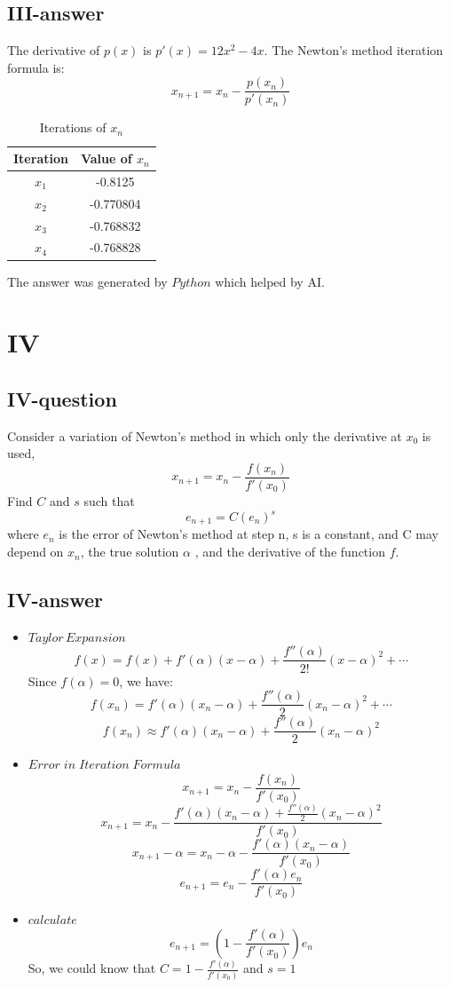 \documentclass[a4paper]{article}
\begin{document}
\subsection*{III-answer}
The derivative of $p(x)$ is $p'(x) = 12x^{2}-4x$. The Newton's method iteration formula is:
$$x_{n+1} = x_n - \frac{p(x_n)}{p'(x_n)}$$
\begin{table}[ht]
  \centering
  \begin{tabular}{|c|c|}
  \hline
  Iteration & Value of $x_n$ \\ \hline
  $x_1$ & -0.8125    \\ \hline
  $x_2$ & -0.770804  \\ \hline
  $x_3$ & -0.768832  \\ \hline
  $x_4$ & -0.768828  \\ \hline
  \end{tabular}
  \caption{Iterations of $x_n$}
  \label{table:iterations}
  \end{table}
The answer was generated by $Python$ which helped by AI. \cite{kimiassistant}

\section*{IV}
\subsection*{IV-question}
Consider a variation of Newton's method in which only the derivative at $x_0$ is used,$$x_{n+1} = x_n - \frac{f(x_n)}{f'(x_0)}$$
Find $C$ and $s$ such that $$e_{n+1} = C(e_n)^s$$ where $e_n$ is the error of Newton's method at step n, s is
a constant, and C may depend on $x_n$, the true solution $\alpha$ , and the derivative of the function $f$.

\subsection*{IV-answer}
\begin{itemize}
  \item $Taylor \, Expansion$
    $$f(x) = f(x) + f'(\alpha )(x - \alpha ) + \frac{f''(\alpha )}{2!}(x - \alpha )^2 + \cdots$$
    Since \(f(\alpha) = 0\), we have:
    $$ f(x_n) = f'(\alpha)(x_n - \alpha) + \frac{f''(\alpha)}{2}(x_n - \alpha)^2 + \cdots $$
    $$ f(x_n) \approx f'(\alpha)(x_n - \alpha) + \frac{f''(\alpha)}{2}(x_n - \alpha)^2 $$
  \item $Error \; in \; Iteration \; Formula$
    $$ x_{n+1} = x_n - \frac{f(x_n)}{f'(x_0)} $$
    $$ x_{n+1} = x_n - \frac{f'(\alpha)(x_n - \alpha) + \frac{f''(\alpha)}{2}(x_n - \alpha)^2}{f'(x_0)} $$
    $$ x_{n+1} - \alpha = x_n - \alpha - \frac{f'(\alpha)(x_n - \alpha)}{f'(x_0)} $$
    $$ e_{n+1} = e_n - \frac{f'(\alpha) e_n}{f'(x_0)} $$
  \item $calculate$
    $$ e_{n+1} = (1 - \frac{f'(\alpha)}{f'(x_0)} ) e_n $$
    So, we could know that $C = 1 - \frac{f'(\alpha)}{f'(x_0)} $ and $s = 1$
\end{itemize}
\end{document}
